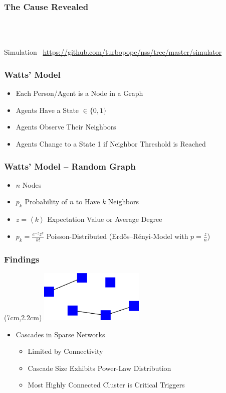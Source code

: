 \documentclass[slidestop,usenames,dvipsnames]{beamer}
\newcommand{\fitem}{\pause\vfill\item}
\newcommand{\gitem}{\vfill\item}
\begin{document}
\begin{frame}
    \frametitle{The Cause Revealed}
    \vfill
    \begin{center}
        \\
        \vspace{20pt}
        \\
        \vspace{20pt}
    \end{center}
    \vfill
\end{frame}

\begin{frame}
    \vfill
    \begin{center}
        {\Huge Simulation}\
        \vfill
        \url{https://github.com/turbopope/nss/tree/master/simulator}
    \end{center}
\end{frame}



\begin{frame}
    \frametitle{Watts' Model}
    \begin{itemize}
        \gitem Each Person/Agent is a Node in a Graph
        \gitem Agents Have a State $\in \lbrace 0, 1 \rbrace$
        \gitem Agents Observe Their Neighbors
        \gitem Agents Change to a State 1 if Neighbor Threshold is Reached
    \end{itemize}
    \vfill
\end{frame}

\begin{frame}
    \frametitle{Watts' Model -- Random Graph}
    \begin{itemize}
        \fitem $n$ Nodes
        \fitem $p_k$ Probability of $n$ to Have $k$ Neighbors
        \fitem $z = \left<k\right>$ Expectation Value or Average Degree
        \fitem $p_k = \frac{e^{-z}z^k}{k!}$ Poisson-Distributed (Erdős–Rényi-Model with $p = \frac{z}{n}$)
    \end{itemize}
    \vfill
\end{frame}

\begin{frame}
    \frametitle{Findings}
    \begin{textblock*}{5cm}(7cm,2.2cm)
        \includegraphics[width=5cm]{img/sparse}
    \end{textblock*}
    \begin{itemize}
        \gitem Cascades in Sparse Networks
        \begin{itemize}
          \fitem Limited by Connectivity
          \fitem Cascade Size Exhibits Power-Law Distribution
          \fitem Most Highly Connected Cluster is Critical Triggers
        \end{itemize}
    \end{itemize}
    \vfill
\end{frame}
\end{document}
